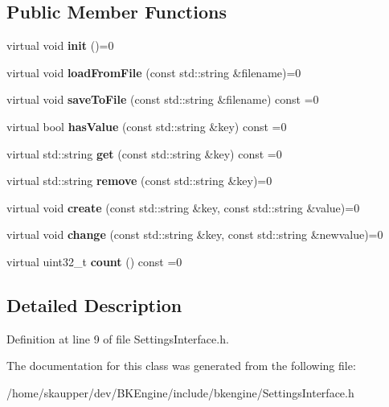 \subsection*{Public Member Functions}
\begin{DoxyCompactItemize}
\item 
\mbox{\label{classbkengine_1_1SettingsInterface_a1022cfb0b4e25bc73563082456db3913}} 
virtual void {\bfseries init} ()=0
\item 
\mbox{\label{classbkengine_1_1SettingsInterface_a7f5937eb93d953422c997b00f6ba21a8}} 
virtual void {\bfseries load\+From\+File} (const std\+::string \&filename)=0
\item 
\mbox{\label{classbkengine_1_1SettingsInterface_a5aaaa97c4131306a4bd5b4635b08fd48}} 
virtual void {\bfseries save\+To\+File} (const std\+::string \&filename) const =0
\item 
\mbox{\label{classbkengine_1_1SettingsInterface_a8e8ab86b2ece557d6e54fe1bc5bcef49}} 
virtual bool {\bfseries has\+Value} (const std\+::string \&key) const =0
\item 
\mbox{\label{classbkengine_1_1SettingsInterface_a97607df1c2261e5311084283fdcb179e}} 
virtual std\+::string {\bfseries get} (const std\+::string \&key) const =0
\item 
\mbox{\label{classbkengine_1_1SettingsInterface_a6d39b7291fe754dc1b24cb78078c29f8}} 
virtual std\+::string {\bfseries remove} (const std\+::string \&key)=0
\item 
\mbox{\label{classbkengine_1_1SettingsInterface_a80131ee581fd983125b7c1b73152db8b}} 
virtual void {\bfseries create} (const std\+::string \&key, const std\+::string \&value)=0
\item 
\mbox{\label{classbkengine_1_1SettingsInterface_a596ab8a979efb83a290199aad8d445d7}} 
virtual void {\bfseries change} (const std\+::string \&key, const std\+::string \&newvalue)=0
\item 
\mbox{\label{classbkengine_1_1SettingsInterface_a69a7a944749bfe0319125e1ce416579c}} 
virtual uint32\+\_\+t {\bfseries count} () const =0
\end{DoxyCompactItemize}


\subsection{Detailed Description}


Definition at line 9 of file Settings\+Interface.\+h.



The documentation for this class was generated from the following file\+:\begin{DoxyCompactItemize}
\item 
/home/skaupper/dev/\+B\+K\+Engine/include/bkengine/Settings\+Interface.\+h\end{DoxyCompactItemize}
